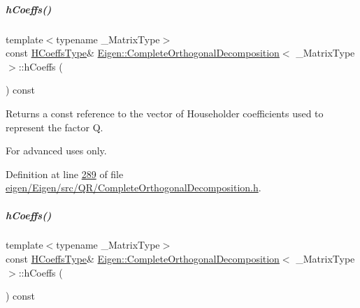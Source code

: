 \mbox{\label{group___q_r___module_ad25a868ecd499d6dda0119e4d3659504}} 
\subparagraph{\texorpdfstring{h\+Coeffs()}{hCoeffs()}\hspace{0.1cm}{\footnotesize\ttfamily [1/2]}}
{\footnotesize\ttfamily template$<$typename \+\_\+\+Matrix\+Type$>$ \\
const \hyperlink{class_eigen_1_1internal_1_1_tensor_lazy_evaluator_writable}{H\+Coeffs\+Type}\& \hyperlink{group___q_r___module_class_eigen_1_1_complete_orthogonal_decomposition}{Eigen\+::\+Complete\+Orthogonal\+Decomposition}$<$ \+\_\+\+Matrix\+Type $>$\+::h\+Coeffs (\begin{DoxyParamCaption}{ }\end{DoxyParamCaption}) const\hspace{0.3cm}{\ttfamily [inline]}}

\begin{DoxyReturn}{Returns}
a const reference to the vector of Householder coefficients used to represent the factor {\ttfamily Q}.
\end{DoxyReturn}
For advanced uses only. 

Definition at line \hyperlink{eigen_2_eigen_2src_2_q_r_2_complete_orthogonal_decomposition_8h_source_l00289}{289} of file \hyperlink{eigen_2_eigen_2src_2_q_r_2_complete_orthogonal_decomposition_8h_source}{eigen/\+Eigen/src/\+Q\+R/\+Complete\+Orthogonal\+Decomposition.\+h}.

\mbox{\label{group___q_r___module_ad25a868ecd499d6dda0119e4d3659504}} 
\subparagraph{\texorpdfstring{h\+Coeffs()}{hCoeffs()}\hspace{0.1cm}{\footnotesize\ttfamily [2/2]}}
{\footnotesize\ttfamily template$<$typename \+\_\+\+Matrix\+Type$>$ \\
const \hyperlink{class_eigen_1_1internal_1_1_tensor_lazy_evaluator_writable}{H\+Coeffs\+Type}\& \hyperlink{group___q_r___module_class_eigen_1_1_complete_orthogonal_decomposition}{Eigen\+::\+Complete\+Orthogonal\+Decomposition}$<$ \+\_\+\+Matrix\+Type $>$\+::h\+Coeffs (\begin{DoxyParamCaption}{ }\end{DoxyParamCaption}) const\hspace{0.3cm}{\ttfamily [inline]}}

